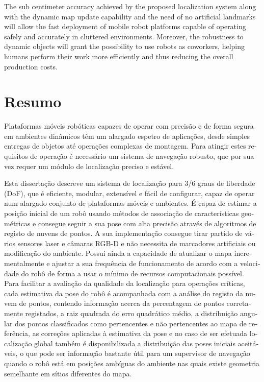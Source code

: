 The sub centimeter accuracy achieved by the proposed localization system along with the dynamic map update capability and the need of no artificial landmarks will allow the fast deployment of mobile robot platforms capable of operating safely and accurately in cluttered environments. Moreover, the robustness to dynamic objects will grant the possibility to use robots as coworkers, helping humans perform their work more efficiently and thus reducing the overall production costs.



\chapter*{Resumo}

\begin{otherlanguage}{portuguese}

Plataformas móveis robóticas capazes de operar com precisão e de forma segura em ambientes dinâmicos têm um alargado espetro de aplicações, desde simples entregas de objetos até operações complexas de montagem. Para atingir estes requisitos de operação é necessário um sistema de navegação robusto, que por sua vez requer um módulo de localização preciso e estável.

Esta dissertação descreve um sistema de localização para 3/6 graus de liberdade (DoF), que é eficiente, modular, extensível e fácil de configurar, capaz de operar num alargado conjunto de plataformas móveis e ambientes. É capaz de estimar a posição inicial de um robô usando métodos de associação de características geométricas e consegue seguir a sua pose com alta precisão através de algoritmos de registo de nuvens de pontos. A sua implementação consegue tirar partido de vários sensores laser e câmaras RGB-D e não necessita de marcadores artificiais ou modificação do ambiente. Possui ainda a capacidade de atualizar o mapa incrementalmente e ajustar a sua frequência de funcionamento de acordo com a velocidade do robô de forma a usar o mínimo de recursos computacionais possível. Para facilitar a avaliação da qualidade da localização para operações críticas, cada estimativa da pose do robô é acompanhada com a análise do registo da nuvem de pontos, contendo informação acerca da percentagem de pontos corretamente registados, a raiz quadrada do erro quadrático médio, a distribuição angular dos pontos classificados como pertencentes e não pertencentes ao mapa de referência, as correções aplicadas à estimativa da pose e no caso de ser efetuada localização global também é disponibilizada a distribuição das poses iniciais aceitáveis, o que pode ser informação bastante útil para um supervisor de navegação quando o robô está em posições ambíguas do ambiente nas quais existe geometria semelhante em sítios diferentes do mapa.


\end{otherlanguage}
